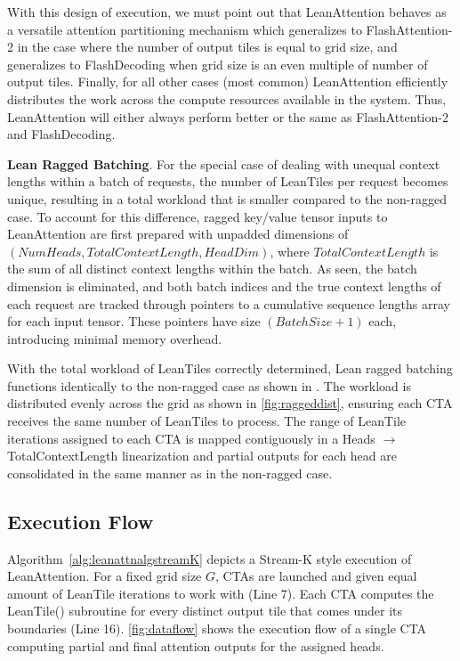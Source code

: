 With this design of execution, we must point out that LeanAttention behaves as a versatile attention partitioning mechanism which generalizes to FlashAttention-2 in the case where the number of output tiles is equal to grid size, and generalizes to FlashDecoding when grid size is an even multiple of number of output tiles. Finally, for all other cases (most common) LeanAttention efficiently distributes the work across the compute resources available in the system. Thus, LeanAttention will either always perform better or the same as FlashAttention-2 and FlashDecoding.

{\textbf{Lean Ragged Batching}}. For the special case of dealing with unequal context lengths within a batch of requests, the number of LeanTiles per request becomes unique, resulting in a total workload that is smaller compared to the non-ragged case. To account for this difference, ragged key/value tensor inputs to LeanAttention are first prepared with unpadded dimensions of $(NumHeads, TotalContextLength, HeadDim)$, where $TotalContextLength$ is the sum of all distinct context lengths within the batch. As seen, the batch dimension is eliminated, and both batch indices and the true context lengths of each request are tracked through pointers to a cumulative sequence lengths array for each input tensor. These pointers have size $(BatchSize + 1)$ each, introducing minimal memory overhead.

With the total workload of LeanTiles correctly determined, Lean ragged batching functions identically to the non-ragged case as shown in . The workload is distributed evenly across the grid as shown in \autoref{fig:raggeddist}, ensuring each CTA receives the same number of LeanTiles to process. The range of LeanTile iterations assigned to each CTA is mapped contiguously in a Heads $\rightarrow$ TotalContextLength linearization and partial outputs for each head are consolidated in the same manner as in the non-ragged case.

\subsection{Execution Flow}
\label{subsec:executionflow}
Algorithm~\ref{alg:leanattnalgstreamK} depicts a Stream-K style execution of LeanAttention. For a fixed grid size $G$, CTAs are launched and given equal amount of LeanTile iterations to work with (Line 7). Each CTA computes the LeanTile() subroutine for every distinct output tile that comes under its boundaries (Line 16). \autoref{fig:dataflow} shows the execution flow of a single CTA computing partial and final attention outputs for the assigned heads.


